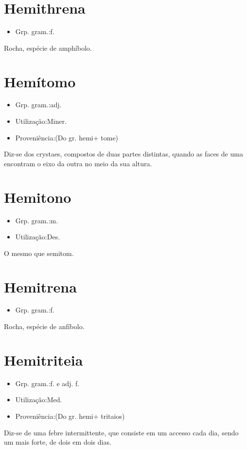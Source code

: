 \documentclass{article}
\begin{document}
\section{Hemithrena}
\begin{itemize}
\item {Grp. gram.:f.}
\end{itemize}
Rocha, espécie de amphíbolo.
\section{Hemítomo}
\begin{itemize}
\item {Grp. gram.:adj.}
\end{itemize}
\begin{itemize}
\item {Utilização:Miner.}
\end{itemize}
\begin{itemize}
\item {Proveniência:(Do gr. \textunderscore hemi\textunderscore  + \textunderscore tome\textunderscore )}
\end{itemize}
Diz-se dos crystaes, compostos de duas partes distintas, quando as faces de uma encontram o eixo da outra no meio da sua altura.
\section{Hemitono}
\begin{itemize}
\item {Grp. gram.:m.}
\end{itemize}
\begin{itemize}
\item {Utilização:Des.}
\end{itemize}
O mesmo que \textunderscore semitom\textunderscore .
\section{Hemitrena}
\begin{itemize}
\item {Grp. gram.:f.}
\end{itemize}
Rocha, espécie de anfíbolo.
\section{Hemitriteia}
\begin{itemize}
\item {Grp. gram.:f.  e  adj. f.}
\end{itemize}
\begin{itemize}
\item {Utilização:Med.}
\end{itemize}
\begin{itemize}
\item {Proveniência:(Do gr. \textunderscore hemi\textunderscore  + \textunderscore tritaios\textunderscore )}
\end{itemize}
Diz-se de uma febre intermittente, que consiste em um accesso cada dia, sendo um mais forte, de dois em dois dias.
\end{document}
